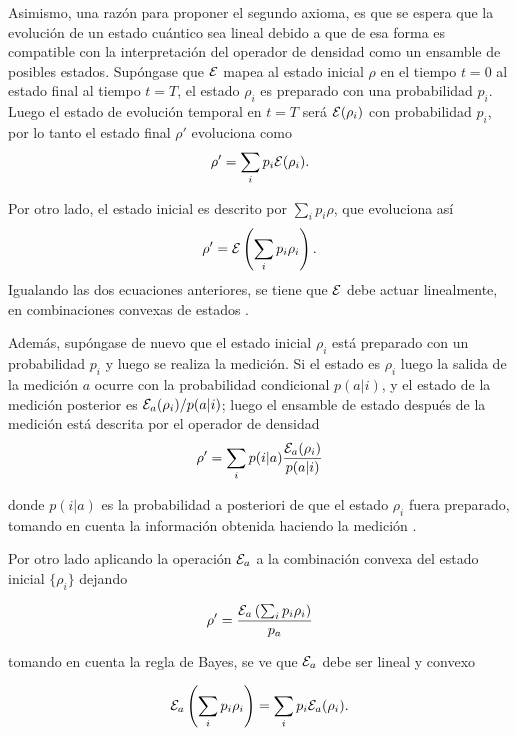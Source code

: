 Asimismo, una razón para proponer el segundo axioma, es que se espera que la evolución de un estado cuántico sea lineal debido a que de esa forma es compatible con la interpretación del operador de densidad como un ensamble de posibles estados. Supóngase que $\mathcal{E}$ mapea al estado inicial $\rho$  en el tiempo $t=0$ al estado final al tiempo $t=T$, el estado $\rho_i$ es preparado con una probabilidad $p_i$. Luego el estado de evolución temporal en $t = T$ será $\mathcal{E}(\rho_i )$ con probabilidad $p_i$, por lo tanto el estado final $\rho'$ evoluciona como 
\begin{equation}
\rho'= \sum_i p_i \mathcal{E} (\rho_i).
\end{equation}

Por otro lado, el estado inicial es descrito por $\sum_i p_i \rho$, que evoluciona así 
\begin{equation}
    \rho'= \mathcal{E}\left(\sum_i p_i \rho_i\right).
\end{equation}
Igualando las dos ecuaciones anteriores, se tiene  que $\mathcal{E}$ debe actuar linealmente,  en combinaciones convexas de estados {\cite{preskill2020quantum}}.


Además, supóngase de nuevo que el estado inicial $\rho_i$ está preparado con un probabilidad $p_i$ y luego se realiza la medición. Si el estado es $\rho_i $ luego la salida de la medición  $a$ ocurre con la probabilidad condicional $p(a|i)$, y el estado de la medición  posterior es $\mathcal{E}_a(\rho_i)/p(a|i)$; luego el ensamble de estado después de la medición está descrita por el operador de densidad 
\begin{equation}
    \rho'=\sum_i p(i|a)\dfrac{\mathcal{E}_a(\rho_i)}{p(a|i)}
\end{equation}

donde $p(i|a)$ es la probabilidad a posteriori de que el estado $\rho_i$ fuera preparado, tomando en cuenta la información obtenida haciendo la medición {\cite{preskill2020quantum}}. 

Por otro lado aplicando la operación $\mathcal{E}_a$  a la combinación convexa del estado inicial $\{\rho_i\}$ dejando 

\begin{equation}
    \rho'=\dfrac{\mathcal{E}_a\left(\sum_i p_i \rho_i\right)}{p_a}
\end{equation}

tomando en cuenta la regla de Bayes, se ve que $\mathcal{E}_a$ debe ser lineal y convexo {\cite{preskill2020quantum}}

\begin{equation}
    \mathcal{E}_a\left(\sum_i p_i \rho_i\right)=\sum_i p_i\mathcal{E}_a(\rho_i). 
\end{equation}

